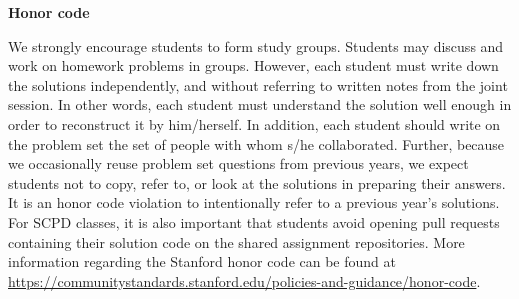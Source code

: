 {\bf Honor code}

We strongly encourage students to form study groups. Students may discuss and
work on homework problems in groups. However, each student must write down the
solutions independently, and without referring to written notes from the joint
session. In other words, each student must understand the solution well enough
in order to reconstruct it by him/herself. In addition, each student should
write on the problem set the set of people with whom s/he collaborated. Further,
because we occasionally reuse problem set questions from previous years, we
expect students not to copy, refer to, or look at the solutions in preparing
their answers. It is an honor code violation to intentionally refer to a
previous year's solutions. For SCPD classes, it is also important that students avoid opening pull requests containing their solution code on the shared assignment repositories. More information regarding the Stanford honor code
can be found at \url{https://communitystandards.stanford.edu/policies-and-guidance/honor-code}.